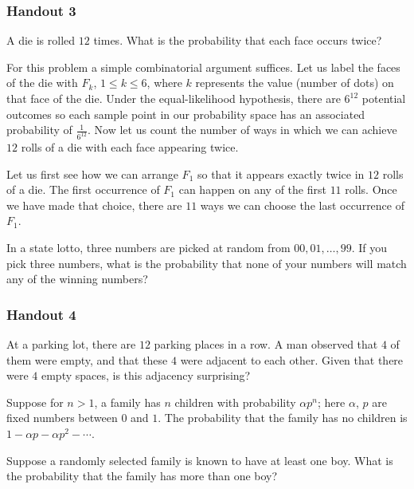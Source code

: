 \subsubsection{Handout 3}
\begin{problem}[Handout 3, \# 4]
  A die is rolled \(12\) times. What is the probability that each face
  occurs twice?
\end{problem}
\begin{solution*}
  For this problem a simple combinatorial argument suffices. Let us label
  the faces of the die with \(F_k\), \(1\leq k\leq 6\), where \(k\)
  represents the value (number of dots) on that face of the die. Under the
  equal-likelihood hypothesis, there are \(6^{12}\) potential outcomes so
  each sample point in our probability space has an associated probability
  of \(\frac{1}{6^{12}}\). Now let us count the number of ways in which we
  can achieve \(12\) rolls of a die with each face appearing twice.

  Let us first see how we can arrange \(F_1\) so that it appears exactly
  twice in \(12\) rolls of a die. The first occurrence of \(F_1\) can
  happen on any of the first \(11\) rolls. Once we have made that choice,
  there are \(11\) ways we can choose the last occurrence of \(F_1\).
\end{solution*}

\begin{problem}[Handout 3, \# 6]
  In a state lotto, three numbers are picked at random from
  \(00,01,\dotsc,99\). If you pick three numbers, what is the probability
  that none of your numbers will match any of the winning numbers?
\end{problem}
\begin{solution*}
\end{solution*}

\subsubsection{Handout 4}
\begin{problem}[Handout 4, \# 4]
  At a parking lot, there are \(12\) parking places in a row. A man
  observed that \(4\) of them were empty, and that these \(4\) were
  adjacent to each other. Given that there were \(4\) empty spaces, is this
  adjacency surprising?
\end{problem}
\begin{solution*}
\end{solution*}

\begin{problem}[Handout 4, \# 16]
  Suppose for \(n>1\), a family has \(n\) children with probability
  \(\alpha p^n\); here \(\alpha\), \(p\) are fixed numbers between \(0\)
  and \(1\). The probability that the family has no children is \(1-\alpha
  p-\alpha p^2-\dotsb\).

  \noindent Suppose a randomly selected family is known to have at least
  one boy. What is the probability that the family has more than one boy?
\end{problem}
\begin{solution*}
\end{solution*}

